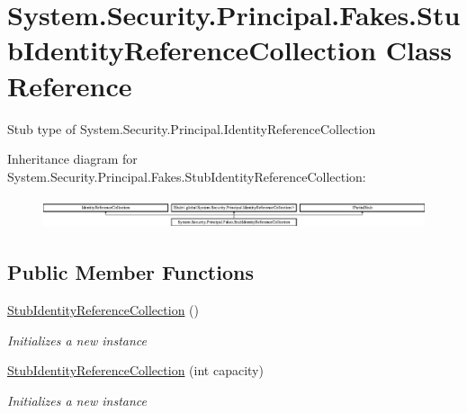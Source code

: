 \hypertarget{class_system_1_1_security_1_1_principal_1_1_fakes_1_1_stub_identity_reference_collection}{\section{System.\-Security.\-Principal.\-Fakes.\-Stub\-Identity\-Reference\-Collection Class Reference}
\label{class_system_1_1_security_1_1_principal_1_1_fakes_1_1_stub_identity_reference_collection}
}


Stub type of System.\-Security.\-Principal.\-Identity\-Reference\-Collection 


Inheritance diagram for System.\-Security.\-Principal.\-Fakes.\-Stub\-Identity\-Reference\-Collection\-:\begin{figure}[H]
\begin{center}
\leavevmode
\includegraphics[height=0.901771cm]{class_system_1_1_security_1_1_principal_1_1_fakes_1_1_stub_identity_reference_collection}
\end{center}
\end{figure}
\subsection*{Public Member Functions}
\begin{DoxyCompactItemize}
\item 
\hyperlink{class_system_1_1_security_1_1_principal_1_1_fakes_1_1_stub_identity_reference_collection_a8de6722c9b37c881423f97cbc795253f}{Stub\-Identity\-Reference\-Collection} ()
\begin{DoxyCompactList}\small\item\em Initializes a new instance\end{DoxyCompactList}\item 
\hyperlink{class_system_1_1_security_1_1_principal_1_1_fakes_1_1_stub_identity_reference_collection_afb170467717527acb3f7bfefe6ce0f76}{Stub\-Identity\-Reference\-Collection} (int capacity)
\begin{DoxyCompactList}\small\item\em Initializes a new instance\end{DoxyCompactList}\end{DoxyCompactItemize}

